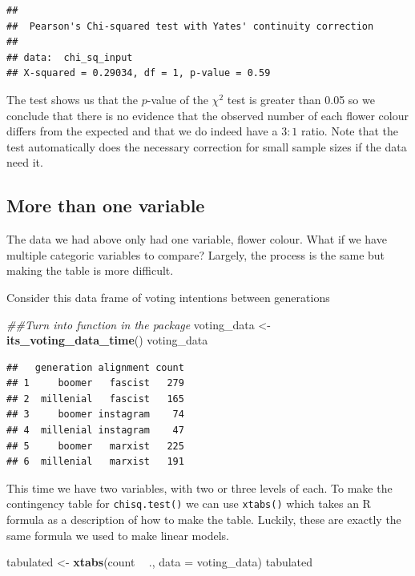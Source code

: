 \documentclass[
]{book}
\newenvironment{Shaded}{\begin{snugshade}}{\end{snugshade}}
\newcommand{\CommentTok}[1]{\textcolor[rgb]{0.56,0.35,0.01}{\textit{#1}}}
\newcommand{\DataTypeTok}[1]{\textcolor[rgb]{0.13,0.29,0.53}{#1}}
\newcommand{\KeywordTok}[1]{\textcolor[rgb]{0.13,0.29,0.53}{\textbf{#1}}}
\newcommand{\NormalTok}[1]{#1}
\newcommand{\OperatorTok}[1]{\textcolor[rgb]{0.81,0.36,0.00}{\textbf{#1}}}
\newcommand{\StringTok}[1]{\textcolor[rgb]{0.31,0.60,0.02}{#1}}
\begin{document}
\begin{verbatim}
## 
## 	Pearson's Chi-squared test with Yates' continuity correction
## 
## data:  chi_sq_input
## X-squared = 0.29034, df = 1, p-value = 0.59
\end{verbatim}

The test shows us that the \(p\)-value of the \(\chi^2\) test is greater than 0.05 so we conclude that there is no evidence that the observed number of each flower colour differs from the expected and that we do indeed have a \(3:1\) ratio. Note that the test automatically does the necessary correction for small sample sizes if the data need it.

\hypertarget{more-than-one-variable}{%
\subsection{More than one variable}\label{more-than-one-variable}}

The data we had above only had one variable, flower colour. What if we have multiple categoric variables to compare? Largely, the process is the same but making the table is more difficult.

Consider this data frame of voting intentions between generations

\begin{Shaded}
\begin{Highlighting}[]
\CommentTok{##Turn into function in the package}
\NormalTok{voting_data <-}\StringTok{ }\KeywordTok{its_voting_data_time}\NormalTok{()}
\NormalTok{voting_data}
\end{Highlighting}
\end{Shaded}

\begin{verbatim}
##   generation alignment count
## 1     boomer   fascist   279
## 2  millenial   fascist   165
## 3     boomer instagram    74
## 4  millenial instagram    47
## 5     boomer   marxist   225
## 6  millenial   marxist   191
\end{verbatim}

This time we have two variables, with two or three levels of each. To make the contingency table for \texttt{chisq.test()} we can use \texttt{xtabs()} which takes an R formula as a description of how to make the table. Luckily, these are exactly the same formula we used to make linear models.

\begin{Shaded}
\begin{Highlighting}[]
\NormalTok{tabulated <-}\StringTok{ }\KeywordTok{xtabs}\NormalTok{(count }\OperatorTok{~}\StringTok{ }\NormalTok{., }\DataTypeTok{data =}\NormalTok{ voting_data)}
\NormalTok{tabulated}
\end{Highlighting}
\end{Shaded}
\end{document}
